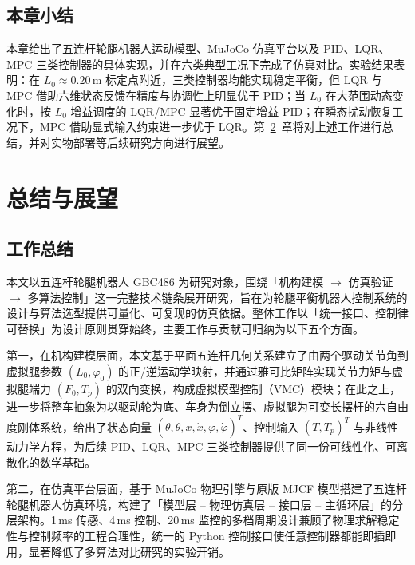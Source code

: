 \documentclass{smbuthesis}
\begin{document}
\section{本章小结}

本章给出了五连杆轮腿机器人运动模型、MuJoCo 仿真平台以及 PID、LQR、MPC 三类控制器的具体实现，并在六类典型工况下完成了仿真对比。实验结果表明：在 $L_0 \approx 0.20\,\mathrm{m}$ 标定点附近，三类控制器均能实现稳定平衡，但 LQR 与 MPC 借助六维状态反馈在精度与协调性上明显优于 PID；当 $L_0$ 在大范围动态变化时，按 $L_0$ 增益调度的 LQR/MPC 显著优于固定增益 PID；在瞬态扰动恢复工况下，MPC 借助显式输入约束进一步优于 LQR。第~\ref{ch:conclusion}~章将对上述工作进行总结，并对实物部署等后续研究方向进行展望。

\chapter{总结与展望}\label{ch:conclusion}

\section{工作总结}

本文以五连杆轮腿机器人 GBC486 为研究对象，围绕「机构建模 $\to$ 仿真验证 $\to$ 多算法控制」这一完整技术链条展开研究，旨在为轮腿平衡机器人控制系统的设计与算法选型提供可量化、可复现的仿真依据。整体工作以「统一接口、控制律可替换」为设计原则贯穿始终，主要工作与贡献可归纳为以下五个方面。

第一，在机构建模层面，本文基于平面五连杆几何关系建立了由两个驱动关节角到虚拟腿参数 $(L_0, \varphi_0)$ 的正/逆运动学映射，并通过雅可比矩阵实现关节力矩与虚拟腿端力 $(F_0, T_p)$ 的双向变换，构成虚拟模型控制（VMC）模块；在此之上，进一步将整车抽象为以驱动轮为底、车身为倒立摆、虚拟腿为可变长摆杆的六自由度刚体系统，给出了状态向量 $(\theta, \dot\theta, x, \dot x, \varphi, \dot\varphi)^T$、控制输入 $(T, T_p)^T$ 与非线性动力学方程，为后续 PID、LQR、MPC 三类控制器提供了同一份可线性化、可离散化的数学基础。

第二，在仿真平台层面，基于 MuJoCo 物理引擎与原版 MJCF 模型搭建了五连杆轮腿机器人仿真环境，构建了「模型层 -- 物理仿真层 -- 接口层 -- 主循环层」的分层架构。1\,ms 传感、4\,ms 控制、20\,ms 监控的多档周期设计兼顾了物理求解稳定性与控制频率的工程合理性，统一的 Python 控制接口使任意控制器都能即插即用，显著降低了多算法对比研究的实验开销。
\end{document}
